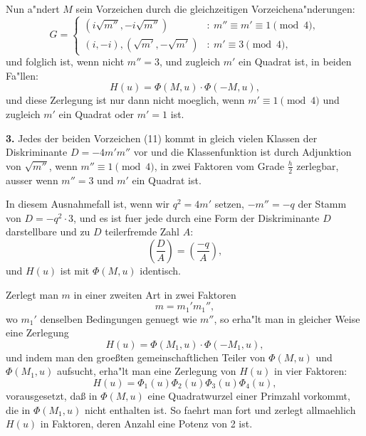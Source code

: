 \documentclass[12pt,a4paper]{article}
\theoremstyle{plain}
\theoremstyle{definition}
\theoremstyle{remark}
\begin{document}
Nun a"ndert $M$ sein Vorzeichen durch die gleichzeitigen Vorzeichena"nderungen:
\begin{equation}\label{eq:138_13}
G = \begin{cases}
(i\sqrt{m''}, -i\sqrt{m''}) & :\ m'' \equiv m' \equiv 1 \pmod{4},\\
(i, -i), (\sqrt{m'}, -\sqrt{m'}) & :\ m' \equiv 3 \pmod{4},
\end{cases}
\end{equation}
und folglich ist, wenn nicht $m'' = 3$, und zugleich $m'$ ein Quadrat ist, in beiden Fa"llen:
\begin{equation}\label{eq:138_14}
H(u) = \Phi(M, u) \cdot \Phi(-M, u),
\end{equation}
und diese Zerlegung ist nur dann nicht moeglich, wenn $m' \equiv 1 \pmod{4}$ und zugleich $m'$ ein Quadrat oder $m' = 1$ ist.

\newpage

\textbf{3.} Jedes der beiden Vorzeichen (11) kommt in gleich vielen Klassen der Diskriminante $D = -4m'm''$ vor und die Klassenfunktion ist durch Adjunktion von $\sqrt{m''}$, wenn $m'' \equiv 1 \pmod{4}$, in zwei Faktoren vom Grade $\frac{h}{2}$ zerlegbar, ausser wenn $m'' = 3$ und $m'$ ein Quadrat ist.

In diesem Ausnahmefall ist, wenn wir $q^2 = 4m'$ setzen, $-m'' = -q$ der Stamm von $D = -q^2 \cdot 3$, und es ist fuer jede durch eine Form der Diskriminante $D$ darstellbare und zu $D$ teilerfremde Zahl $A$:
\[
\left(\frac{D}{A}\right) = \left(\frac{-q}{A}\right),
\]
und $H(u)$ ist mit $\Phi(M, u)$ identisch.

Zerlegt man $m$ in einer zweiten Art in zwei Faktoren
\begin{equation}\label{eq:138_15}
m = m_1' m_1'',
\end{equation}
wo $m_1'$ denselben Bedingungen genuegt wie $m''$, so erha"lt man in gleicher Weise eine Zerlegung
\begin{equation}\label{eq:138_16}
H(u) = \Phi(M_1, u) \cdot \Phi(-M_1, u),
\end{equation}
und indem man den groe\ss{}ten gemeinschaftlichen Teiler von $\Phi(M, u)$ und $\Phi(M_1, u)$ aufsucht, erha"lt man eine Zerlegung von $H(u)$ in vier Faktoren:
\[
H(u) = \Phi_1(u) \Phi_2(u) \Phi_3(u) \Phi_4(u),
\]
vorausgesetzt, da\ss{} in $\Phi(M, u)$ eine Quadratwurzel einer Primzahl vorkommt, die in $\Phi(M_1, u)$ nicht enthalten ist. So faehrt man fort und zerlegt allmaehlich $H(u)$ in Faktoren, deren Anzahl eine Potenz von 2 ist.
\end{document}
